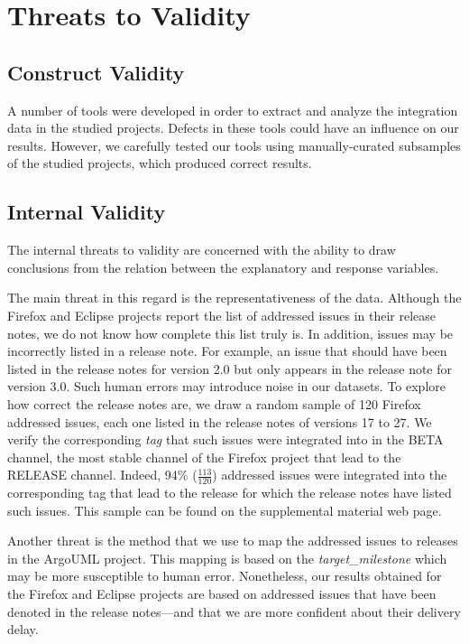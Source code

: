 \section{Threats to Validity} \label{ch4:threats}

\subsection{Construct Validity}
A number of tools were developed in order to extract and analyze the integration
data in the studied projects. Defects in these tools could have an influence on
our results. However, we carefully tested our tools using manually-curated
subsamples of the studied projects, which produced correct results.

\subsection{Internal Validity}
The internal threats to validity are concerned with the ability to draw
conclusions from the relation between the explanatory and response variables.

The main threat in this regard is the representativeness of the data. Although
the Firefox and Eclipse projects report the list of addressed issues in their
release notes, we do not know how complete this list truly is. In addition,
issues may be incorrectly listed in a release note. For example, an issue that
should have been listed in the release notes for version 2.0 but only appears in
the release note for version 3.0. Such human errors may introduce noise in our
datasets. To explore how correct the release notes are, we draw a random sample
of 120 Firefox addressed issues, each one listed in the release notes of
versions 17 to 27. We verify the corresponding \textit{tag} that such issues
were integrated into in the BETA channel, \ie the most stable channel of the
Firefox project that lead to the RELEASE
channel.
Indeed, 94\% ($\frac{113}{120}$) addressed issues were integrated into the
corresponding tag that lead to the release for which the release notes have
listed such issues. This sample can be found on the supplemental material web
page.

Another threat is the method that we use to map the addressed issues to releases in
the ArgoUML project. This mapping is based on the \textit{target\_milestone}
which may be more susceptible to human error. Nonetheless, our results obtained
for the Firefox and Eclipse projects are based on addressed issues that have been
denoted in the release notes---and that we are more confident about their
delivery delay.

